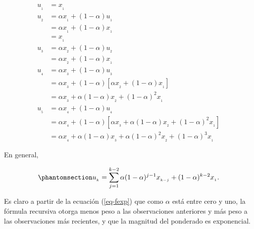 \documentclass[
  us-letterpaper,
]{scrreprt}
\theoremstyle{plain}
\theoremstyle{definition}
\theoremstyle{definition}
\theoremstyle{plain}
\theoremstyle{remark}
\begin{document}
\[
\begin{split}
u_{_1} &= x_{_1}\\
u_{_2} &= \alpha x_{_1}+(1-\alpha)u_{_1}\\ &=\alpha x_{_1}+(1-\alpha)x_{_1}\\ &=x_{_1}\\
u_{_3} &= \alpha x_{_2}+(1-\alpha)u_{_2}\\ &=\alpha x_{_2}+(1-\alpha)x_{_1}\\
u_{_4} &= \alpha x_{_3}+(1-\alpha)u_{_3}\\ &=\alpha x_{_3}+(1-\alpha)[\alpha x_{_2}+(1-\alpha)x_{_1}]\\ &=\alpha x_{_3} + \alpha(1-\alpha)x_{_2}+(1-\alpha)^2x_{_1}\\
u_{_5} &= \alpha x_{_4}+(1-\alpha)u_{_4}\\ &=\alpha x_{_4}+(1-\alpha)[\alpha x_{_3}+\alpha(1-\alpha)x_{_2}+(1-\alpha)^2x_{_1}]\\ &=\alpha x_{_4} + \alpha(1-\alpha)x_{_3}+\alpha(1-\alpha)^2 x_{_2}+(1-\alpha)^3x_{_1}
\end{split}
\]

En general,

\begin{equation}\phantomsection\label{eq-fexp}{
u_{_k}=\sum_{j=1}^{k-2}\alpha(1-\alpha)^{j-1}x_{_{k-j}}+(1-\alpha)^{k-2}x_{_1}.
}\end{equation}

Es claro a partir de la ecuación (\ref{eq-fexp}) que como \(\alpha\)
está entre cero y uno, la fórmula recursiva otorga menos peso a las
observaciones anteriores y más peso a las observaciones más recientes, y
que la magnitud del ponderado es exponencial.
\end{document}
